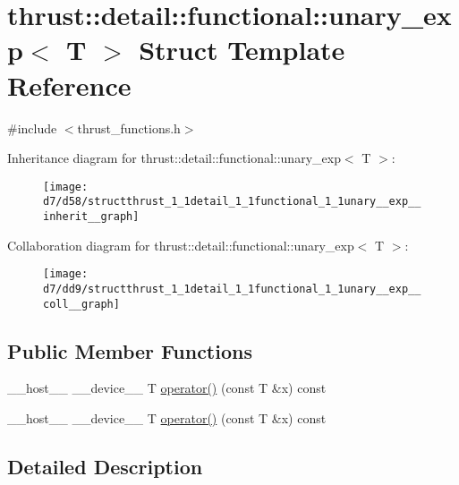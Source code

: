 \hypertarget{structthrust_1_1detail_1_1functional_1_1unary__exp}{}\section{thrust\+:\+:detail\+:\+:functional\+:\+:unary\+\_\+exp$<$ T $>$ Struct Template Reference}
\label{structthrust_1_1detail_1_1functional_1_1unary__exp}


{\ttfamily \#include $<$thrust\+\_\+functions.\+h$>$}



Inheritance diagram for thrust\+:\+:detail\+:\+:functional\+:\+:unary\+\_\+exp$<$ T $>$\+:
\nopagebreak
\begin{figure}[H]
\begin{center}
\leavevmode
\texttt{[image: d7/d58/structthrust\_1\_1detail\_1\_1functional\_1\_1unary\_\_exp\_\_inherit\_\_graph]}
\end{center}
\end{figure}


Collaboration diagram for thrust\+:\+:detail\+:\+:functional\+:\+:unary\+\_\+exp$<$ T $>$\+:
\nopagebreak
\begin{figure}[H]
\begin{center}
\leavevmode
\texttt{[image: d7/dd9/structthrust\_1\_1detail\_1\_1functional\_1\_1unary\_\_exp\_\_coll\_\_graph]}
\end{center}
\end{figure}
\subsection*{Public Member Functions}
\begin{DoxyCompactItemize}
\item 
\+\_\+\+\_\+host\+\_\+\+\_\+ \+\_\+\+\_\+device\+\_\+\+\_\+ T \hyperlink{structthrust_1_1detail_1_1functional_1_1unary__exp_af0c82479fa1834d458d1ab159bf4d5b3}{operator()} (const T \&x) const 
\item 
\+\_\+\+\_\+host\+\_\+\+\_\+ \+\_\+\+\_\+device\+\_\+\+\_\+ T \hyperlink{structthrust_1_1detail_1_1functional_1_1unary__exp_af0c82479fa1834d458d1ab159bf4d5b3}{operator()} (const T \&x) const 
\end{DoxyCompactItemize}


\subsection{Detailed Description}
